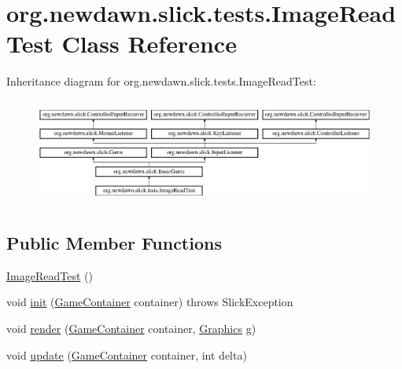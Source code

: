 \hypertarget{classorg_1_1newdawn_1_1slick_1_1tests_1_1_image_read_test}{}\section{org.\+newdawn.\+slick.\+tests.\+Image\+Read\+Test Class Reference}
\label{classorg_1_1newdawn_1_1slick_1_1tests_1_1_image_read_test}
Inheritance diagram for org.\+newdawn.\+slick.\+tests.\+Image\+Read\+Test\+:\begin{figure}[H]
\begin{center}
\leavevmode
\includegraphics[height=3.522012cm]{classorg_1_1newdawn_1_1slick_1_1tests_1_1_image_read_test}
\end{center}
\end{figure}
\subsection*{Public Member Functions}
\begin{DoxyCompactItemize}
\item 
\mbox{\hyperlink{classorg_1_1newdawn_1_1slick_1_1tests_1_1_image_read_test_ac33f59aec733dc068e8838a4da22bcf9}{Image\+Read\+Test}} ()
\item 
void \mbox{\hyperlink{classorg_1_1newdawn_1_1slick_1_1tests_1_1_image_read_test_a2c97baa516a59d3dad308bf3e2311280}{init}} (\mbox{\hyperlink{classorg_1_1newdawn_1_1slick_1_1_game_container}{Game\+Container}} container)  throws Slick\+Exception 
\item 
void \mbox{\hyperlink{classorg_1_1newdawn_1_1slick_1_1tests_1_1_image_read_test_a994bae008ffc8f225a9cd5a96d2e9359}{render}} (\mbox{\hyperlink{classorg_1_1newdawn_1_1slick_1_1_game_container}{Game\+Container}} container, \mbox{\hyperlink{classorg_1_1newdawn_1_1slick_1_1_graphics}{Graphics}} \mbox{\hyperlink{classorg_1_1newdawn_1_1slick_1_1tests_1_1_image_read_test_a13250d14a7e738e60c94a62d6b55c566}{g}})
\item 
void \mbox{\hyperlink{classorg_1_1newdawn_1_1slick_1_1tests_1_1_image_read_test_a20aafb02e7bcbcedd1f7dc60bd1753dc}{update}} (\mbox{\hyperlink{classorg_1_1newdawn_1_1slick_1_1_game_container}{Game\+Container}} container, int delta)
\end{DoxyCompactItemize}
